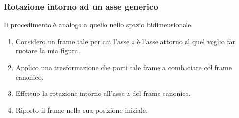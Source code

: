 \subsubsection{Rotazione intorno ad un asse generico}
Il procedimento \`e analogo a quello nello spazio bidimensionale.
\begin{enumerate}
	\item Considero un frame tale per cui l'asse $z$ \`e l'asse attorno al quel voglio far
	      ruotare la mia figura.
	\item Applico una trasformazione che porti tale frame a combaciare col frame
	      canonico.
	\item Effettuo la rotazione intorno all'asse $z$ del frame canonico.
	\item Riporto il frame nella sua posizione iniziale.
\end{enumerate}